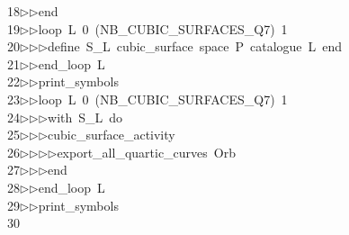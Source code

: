 \begin{tabbing}
18\>$\triangleright$\>$\triangleright$\>end\ \\[0pt]
19\>$\triangleright$\>$\triangleright$\>loop\ L\ 0\ (NB\_CUBIC\_SURFACES\_Q7)\ 1\ \\[0pt]
20\>$\triangleright$\>$\triangleright$\>$\triangleright$\>define\ S\_L\ cubic\_surface\ space\ P\ catalogue\ L\ end\ \\[0pt]
21\>$\triangleright$\>$\triangleright$\>end\_loop\ L\ \\[0pt]
22\>$\triangleright$\>$\triangleright$\>print\_symbols\ \\[0pt]
23\>$\triangleright$\>$\triangleright$\>loop\ L\ 0\ (NB\_CUBIC\_SURFACES\_Q7)\ 1\ \\[0pt]
24\>$\triangleright$\>$\triangleright$\>$\triangleright$\>with\ S\_L\ do\ \\[0pt]
25\>$\triangleright$\>$\triangleright$\>$\triangleright$\>cubic\_surface\_activity\ \\[0pt]
26\>$\triangleright$\>$\triangleright$\>$\triangleright$\>$\triangleright$\>export\_all\_quartic\_curves\ Orb\ \\[0pt]
27\>$\triangleright$\>$\triangleright$\>$\triangleright$\>end\ \\[0pt]
28\>$\triangleright$\>$\triangleright$\>end\_loop\ L\ \\[0pt]
29\>$\triangleright$\>$\triangleright$\>print\_symbols\\[0pt]
30\>\end{tabbing}
